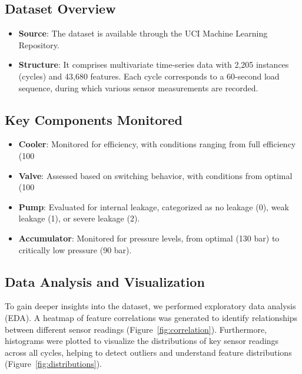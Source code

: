 \documentclass[sigconf]{acmart}
\begin{document}
\subsection{Dataset Overview} 
\begin{itemize} 
    \item \textbf{Source}: The dataset is available through the UCI Machine Learning Repository.
    \item \textbf{Structure}: It comprises multivariate time-series data with 2,205 instances (cycles) and 43,680 features. Each cycle corresponds to a 60-second load sequence, during which various sensor measurements are recorded.
\end{itemize}

\subsection{Key Components Monitored} 
\begin{itemize} 
    \item \textbf{Cooler}: Monitored for efficiency, with conditions ranging from full efficiency (100%
    \item \textbf{Valve}: Assessed based on switching behavior, with conditions from optimal (100%
    \item \textbf{Pump}: Evaluated for internal leakage, categorized as no leakage (0), weak leakage (1), or severe leakage (2).
    \item \textbf{Accumulator}: Monitored for pressure levels, from optimal (130 bar) to critically low pressure (90 bar).
\end{itemize}

\subsection{Data Analysis and Visualization} 
To gain deeper insights into the dataset, we performed exploratory data analysis (EDA). A heatmap of feature correlations was generated to identify relationships between different sensor readings (Figure~\ref{fig:correlation}). Furthermore, histograms were plotted to visualize the distributions of key sensor readings across all cycles, helping to detect outliers and understand feature distributions (Figure~\ref{fig:distributions}).
\end{document}

